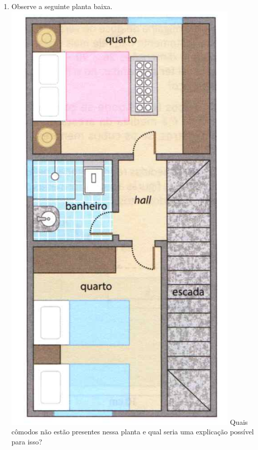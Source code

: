 \documentclass[a4paper,14pt]{article}
\begin{document}
\begin{multicols}{2}
\begin{enumerate}
			\item Observe a seguinte planta baixa. \\
			\includegraphics[width=1.1\linewidth]{6FMA30_imagens/imagem8}
			Quais cômodos não estão presentes nessa planta e qual seria uma explicação possível para isso?
			
			
		\end{enumerate}
		$~$ \\ $~$ \\ $~$ \\ $~$ \\ $~$ \\ $~$ \\ $~$ \\ $~$ \\ $~$ \\ $~$ \\ $~$ \\
	\end{multicols}
\end{document}
